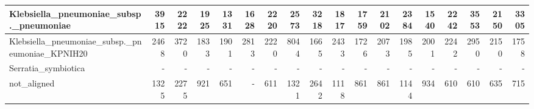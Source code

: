 \documentclass[12pt,a4paper]{article}
\begin{document}
\begin{table}[ht]
\begin{center}
\begin{tabular}{|l*{17}{|r}|}
Klebsiella\_pneumoniae\_subsp.\_pneumoniae & 3915 & 2222 & 1925 & 1331 & 1628 & 2220 & 2573 & 3218 & 1817 & 1759 & 2102 & 2384 & 1540 & 2242 & 3553 & 2150 & 3305 \\ \hline
Klebsiella\_pneumoniae\_subsp.\_pneumoniae\_KPNIH20 & 2468 & 3720 & 1833 & 1901 & 2813 & 2220 & 8044 & 1665 & 2433 & 1726 & 2073 & 1985 & 2001 & 2242 & 2950 & 2150 & 1758 \\ \hline
Serratia\_symbiotica & - & - & - & - & - & - & - & - & - & - & - & - & - & - & - & - & - \\ \hline
not\_aligned & 1325 & 2275 & 921 & 651 & - & 611 & 1321 & 2642 & 1118 & 861 & 861 & 1144 & 934 & 610 & 610 & 635 & 715 \\ \hline
\end{tabular}
\end{center}
\end{table}
\end{document}
